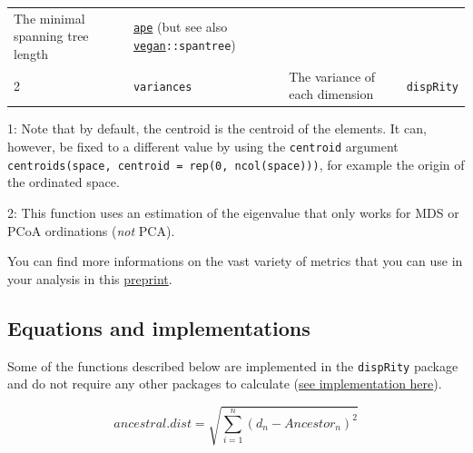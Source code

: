 \documentclass[]{book}
\begin{document}
\begin{longtable}[]{@{}llll@{}}
\begin{minipage}[t]{0.64\columnwidth}
The minimal spanning tree length\strut
\end{minipage} & \begin{minipage}[t]{0.10\columnwidth}\raggedright
\href{https://cran.r-project.org/web/packages/vegan/index.html}{\texttt{ape}} (but see also \href{https://cran.r-project.org/web/packages/vegan/index.html}{\texttt{vegan}}\texttt{::spantree})\strut
\end{minipage}\tabularnewline
\begin{minipage}[t]{0.07\columnwidth}\raggedright
2\strut
\end{minipage} & \begin{minipage}[t]{0.07\columnwidth}\raggedright
\texttt{variances}\strut
\end{minipage} & \begin{minipage}[t]{0.64\columnwidth}\raggedright
The variance of each dimension\strut
\end{minipage} & \begin{minipage}[t]{0.10\columnwidth}\raggedright
\texttt{dispRity}\strut
\end{minipage}\tabularnewline
\bottomrule
\end{longtable}

1: Note that by default, the centroid is the centroid of the elements.
It can, however, be fixed to a different value by using the \texttt{centroid} argument \texttt{centroids(space,\ centroid\ =\ rep(0,\ ncol(space)))}, for example the origin of the ordinated space.

2: This function uses an estimation of the eigenvalue that only works for MDS or PCoA ordinations (\emph{not} PCA).

You can find more informations on the vast variety of metrics that you can use in your analysis in this \href{https://www.biorxiv.org/content/10.1101/801571v1}{preprint}.

\hypertarget{equations-and-implementations}{%
\subsection{Equations and implementations}\label{equations-and-implementations}}

Some of the functions described below are implemented in the \texttt{dispRity} package and do not require any other packages to calculate (\href{https://github.com/TGuillerme/dispRity/blob/master/R/dispRity.metric.R}{see implementation here}).

\begin{equation}
    ancestral.dist = \sqrt{\sum_{i=1}^{n}{({d}_{n}-Ancestor_{n})^2}}
\end{equation}
\end{document}
